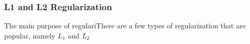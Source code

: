 \subsubsection{L1 and L2 Regularization}

The main purpose of regulariThere are a few types of regularization that are popular, namely $L_1$ and $L_2$